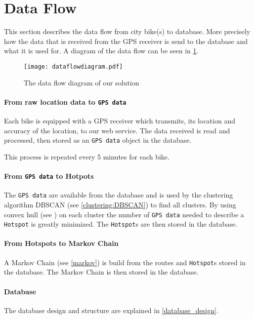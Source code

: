 \section{Data Flow}
This section describes the data flow from city bike(s) to database. More precisely how the data that is received from the GPS receiver is send to the database and what it is used for.
A diagram of the data flow can be seen in \cref{fig:dataFlowDiagram}.

\begin{figure}[H]
\texttt{[image: dataflowdiagram.pdf]}
\caption{The data flow diagram of our solution}
\label{fig:dataFlowDiagram}
\end{figure}

\paragraph{From raw location data to \texttt{GPS data}}
Each bike is equipped with a GPS receiver which transmits, its location and accuracy of the location, to our web service.
The data received is read and processed, then stored as an \texttt{GPS data} object in the database.

This process is repeated every 5 minutes for each bike.

\paragraph{From \texttt{GPS data} to Hotpots}
The \texttt{GPS data} are available from the database and is used by the clustering algorithm DBSCAN (see \cref{clustering:DBSCAN}) to find all clusters.
By using convex hull (see \cite[page 1031]{aadbook}) on each cluster the number of \texttt{GPS data} needed to describe a \texttt{Hotspot} is greatly minimized.
The \texttt{Hotspot}s are then stored in the database.

\paragraph{From Hotspots to Markov Chain}
A Markov Chain (see \cref{markov}) is build from the routes and \texttt{Hotspot}s stored in the database.
The Markov Chain is then stored in the database.

\paragraph{Database}
The database design and structure are explained in \cref{database_design}.
